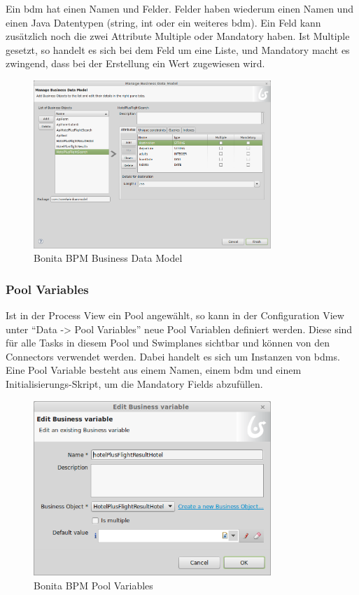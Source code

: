 Ein \gls{bdm} hat einen Namen und Felder. Felder haben wiederum einen Namen und einen Java Datentypen (string, int oder ein weiteres \gls{bdm}). Ein Feld kann zusätzlich noch die zwei Attribute Multiple oder Mandatory haben. Ist Multiple gesetzt, so handelt es sich bei dem Feld um eine Liste, und Mandatory macht es zwingend, dass bei der Erstellung ein Wert zugewiesen wird.

\begin{figure}[H]
	\centering
	\includegraphics[width=0.8\textwidth]{images/bonita-bpm.png}
	\caption{Bonita BPM Business Data Model}
	\label{fig:analyse:bonita:bpm}
\end{figure}

\subsubsection{Pool Variables}
Ist in der Process View ein Pool angewählt, so kann in der Configuration View unter "`Data -> Pool Variables"' neue Pool Variablen definiert werden. Diese sind für alle Tasks in diesem Pool und Swimplanes sichtbar und können von den Connectors verwendet werden. Dabei handelt es sich um Instanzen von \glspl{bdm}. Eine Pool Variable besteht aus einem Namen, einem \gls{bdm} und einem Initialisierungs-Skript, um die Mandatory Fields abzufüllen.
\begin{figure}[H]
	\centering
	\includegraphics[width=0.8\textwidth]{images/bonita-poolvariables.png}
	\caption{Bonita BPM Pool Variables}
	\label{fig:analyse:bonita:bpm:poolvariables}
\end{figure}

